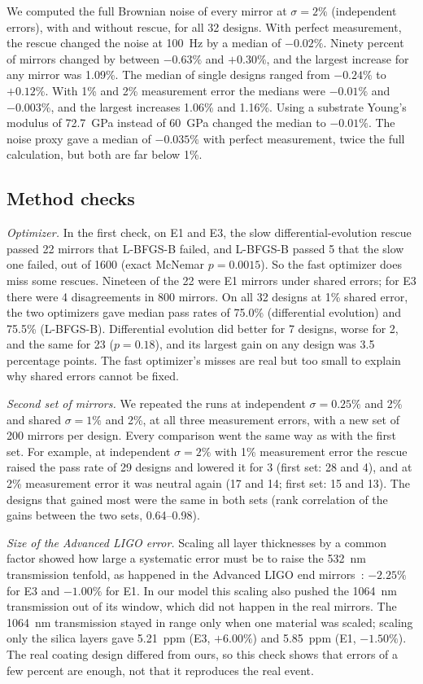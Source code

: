 We computed the full Brownian noise of every mirror at $\sigma = 2\%$ (independent errors), with and without rescue, for all 32 designs. With perfect measurement, the rescue changed the noise at 100~Hz by a median of $-0.02\%$. Ninety percent of mirrors changed by between $-0.63\%$ and $+0.30\%$, and the largest increase for any mirror was 1.09\%. The median of single designs ranged from $-0.24\%$ to $+0.12\%$. With 1\% and 2\% measurement error the medians were $-0.01\%$ and $-0.003\%$, and the largest increases 1.06\% and 1.16\%. Using a substrate Young's modulus of 72.7~GPa instead of 60~GPa changed the median to $-0.01\%$. The noise proxy gave a median of $-0.035\%$ with perfect measurement, twice the full calculation, but both are far below 1\%.

\subsection{Method checks}
\label{sec:checksres}

\emph{Optimizer.} In the first check, on E1 and E3, the slow differential-evolution rescue passed 22 mirrors that L-BFGS-B failed, and L-BFGS-B passed 5 that the slow one failed, out of 1600 (exact McNemar $p = 0.0015$). So the fast optimizer does miss some rescues. Nineteen of the 22 were E1 mirrors under shared errors; for E3 there were 4 disagreements in 800 mirrors. On all 32 designs at 1\% shared error, the two optimizers gave median pass rates of 75.0\% (differential evolution) and 75.5\% (L-BFGS-B). Differential evolution did better for 7 designs, worse for 2, and the same for 23 ($p = 0.18$), and its largest gain on any design was 3.5 percentage points. The fast optimizer's misses are real but too small to explain why shared errors cannot be fixed.

\emph{Second set of mirrors.} We repeated the runs at independent $\sigma = 0.25\%$ and 2\% and shared $\sigma = 1\%$ and 2\%, at all three measurement errors, with a new set of 200 mirrors per design. Every comparison went the same way as with the first set. For example, at independent $\sigma = 2\%$ with 1\% measurement error the rescue raised the pass rate of 29 designs and lowered it for 3 (first set: 28 and 4), and at 2\% measurement error it was neutral again (17 and 14; first set: 15 and 13). The designs that gained most were the same in both sets (rank correlation of the gains between the two sets, 0.64--0.98).

\emph{Size of the Advanced LIGO error.} Scaling all layer thicknesses by a common factor showed how large a systematic error must be to raise the 532~nm transmission tenfold, as happened in the Advanced LIGO end mirrors~\cite{aLIGO2015}: $-2.25\%$ for E3 and $-1.00\%$ for E1. In our model this scaling also pushed the 1064~nm transmission out of its window, which did not happen in the real mirrors. The 1064~nm transmission stayed in range only when one material was scaled; scaling only the silica layers gave 5.21~ppm (E3, $+6.00\%$) and 5.85~ppm (E1, $-1.50\%$). The real coating design differed from ours, so this check shows that errors of a few percent are enough, not that it reproduces the real event.
